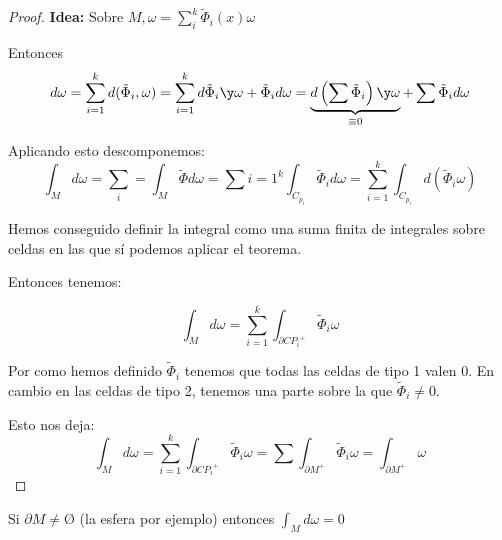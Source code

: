 \begin{proof}
\textbf{Idea:} Sobre $M, \omega=\sum_i^k\tilde{\Phi}_i(x)\omega$

Entonces \[d\omega = \sum_{i=1}^k d(\tilde{\Phi}_i,\omega) = \sum_{i=1}^k d\tilde{\Phi}_i\y \omega + \tilde{\Phi}_i d\omega = \underbrace{d\left(\sum \tilde{\Phi}_i\right) \y \omega}_{\equiv 0} + \sum \tilde{\Phi}_id\omega\]

Aplicando esto descomponemos:
\[\int_M d\omega = \sum_i = \int_M \tilde{\Phi}d\omega = \sum{i=1}^k \int_{C_{p_i}} \tilde{\Phi}_id\omega=\sum_{i=1}^k \int_{C_{p_i}} d(\tilde{\Phi}_i\omega)
\]

Hemos conseguido definir la integral como una suma finita de integrales sobre celdas en las que sí podemos aplicar el teorema.

Entonces tenemos:

\[\int_M d\omega = \sum_{i=1}^k \int_{\partial  C{P_i}^{+}} \tilde{\Phi}_i\omega\]


Por como hemos definido $\tilde{\Phi}_i$ tenemos que todas las celdas de tipo 1 valen 0. En cambio en las celdas de tipo 2, tenemos una parte sobre la que $\tilde{\Phi}_i \neq 0$.

Esto nos deja: \[\int_M d\omega = \sum_{i=1}^k \int_{\partial  C{P_i}^{+}} \tilde{\Phi}_i\omega = \sum \int_{\partial M^+} \tilde{\Phi}_i \omega = \int_{\partial M^+} \omega\]

\end{proof}

\obs Si $\partial M \neq Ø$ (la esfera por ejemplo) entonces $\int_{M} d\omega =0$



